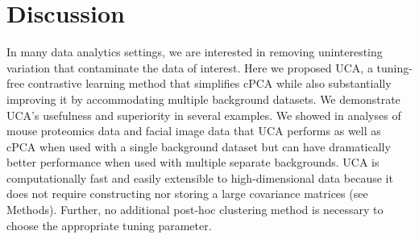 \documentclass[12pt]{article}
\begin{document}
\section{Discussion}
In many data analytics settings, we are interested in removing uninteresting variation that contaminate the data of interest.
Here we proposed UCA, a tuning-free contrastive learning method that simplifies cPCA while also substantially improving it by accommodating multiple background datasets. We demonstrate UCA's usefulness and superiority in several examples. %
We showed in analyses of mouse proteomics data and facial image data that UCA performs as well as cPCA when used with a single background dataset but can have dramatically better performance when used with multiple separate backgrounds. %
UCA is computationally fast and easily extensible to high-dimensional data because it does not require constructing nor storing a large covariance matrices (see Methods). Further, no additional post-hoc clustering method is necessary to choose the appropriate tuning parameter.
\end{document}
